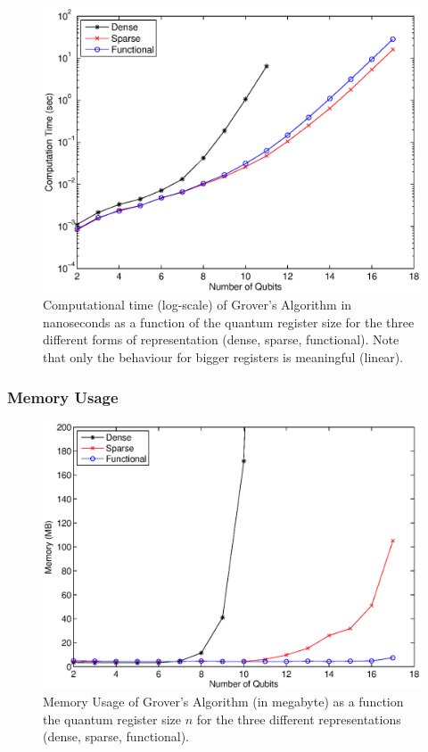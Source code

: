 \documentclass[bibliography=totocnumbered, 10pt]{article}
\theoremstyle{NoticeStyle}
\begin{document}
\begin{figure}[H]
	\centering
	\includegraphics[width=\textwidth]{img/Grover_Time_Performance_log.eps}
	\caption{Computational time (log-scale) of Grover's Algorithm in nanoseconds as a function of the quantum register size for the three different forms of representation (dense, sparse, functional). Note that only the behaviour for bigger registers is meaningful (linear).}
	\label{grover_time_performance_log}
\end{figure}

\subsubsection{Memory Usage}

\begin{figure}[H]
	\centering
	\includegraphics[width=\textwidth]{img/Grover_Memory_Performance.eps}
	\caption{Memory Usage of Grover's Algorithm (in megabyte) as a function the quantum register size $n$ for the three different representations (dense, sparse, functional).}
	\label{grover_memory}
\end{figure}
\end{document}
